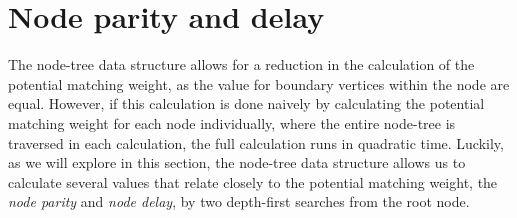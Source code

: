 


\section{Node parity and delay}\label{sec:nodedelay}
The node-tree data structure allows for a reduction in the calculation of the potential matching weight, as the value for boundary vertices within the node are equal. However, if this calculation is done naively by calculating the potential matching weight for each node individually, where the entire node-tree is traversed in each calculation, the full calculation runs in quadratic time. Luckily, as we will explore in this section, the node-tree data structure allows us to calculate several values that relate closely to the potential matching weight, the \emph{node parity} and \emph{node delay}, by two depth-first searches from the root node. 

